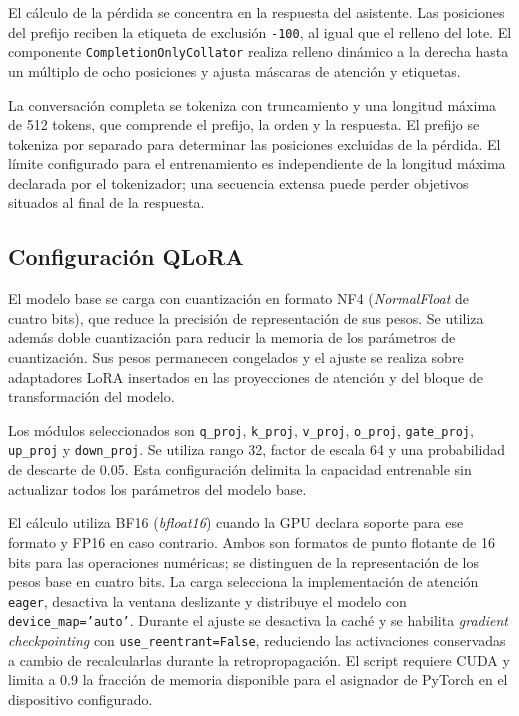 El cálculo de la pérdida se concentra en la respuesta del asistente.
Las posiciones del prefijo reciben la etiqueta de exclusión
\texttt{-100}, al igual que el relleno del lote. El componente
\texttt{Completion\allowbreak Only\allowbreak Collator} realiza relleno dinámico a la derecha
hasta un múltiplo de ocho posiciones y ajusta máscaras de atención y
etiquetas.

La conversación completa se tokeniza con truncamiento y una longitud
máxima de 512 tokens, que comprende el prefijo, la orden y la respuesta.
El prefijo se tokeniza por separado para determinar las posiciones
excluidas de la pérdida. El límite configurado para el entrenamiento
es independiente de la longitud máxima declarada por el tokenizador;
una secuencia extensa puede perder objetivos situados al final de la
respuesta.

\subsection{Configuración QLoRA}

El modelo base se carga con cuantización en formato NF4
(\textit{NormalFloat} de cuatro bits), que reduce la precisión de
representación de sus pesos. Se utiliza además doble cuantización para
reducir la memoria de los parámetros de cuantización. Sus pesos permanecen congelados y el ajuste se
realiza sobre adaptadores LoRA insertados en las proyecciones de atención
y del bloque de transformación del modelo.

Los módulos seleccionados son \texttt{q\_proj}, \texttt{k\_proj},
\texttt{v\_proj}, \texttt{o\_proj}, \texttt{gate\_proj},
\texttt{up\_proj} y \texttt{down\_proj}. Se utiliza rango 32, factor
de escala 64 y una probabilidad de descarte de 0.05. Esta configuración
delimita la capacidad entrenable sin actualizar todos los parámetros
del modelo base.

El cálculo utiliza BF16 (\textit{bfloat16}) cuando la GPU declara soporte
para ese formato y FP16 en caso contrario. Ambos son formatos de punto
flotante de 16 bits para las operaciones numéricas; se distinguen de la
representación de los pesos base en cuatro bits. La carga selecciona la implementación de
atención \texttt{eager}, desactiva la ventana deslizante y distribuye
el modelo con \texttt{device\_\allowbreak map='auto'}. Durante el ajuste se
desactiva la caché y se habilita \textit{gradient checkpointing} con
\texttt{use\_\allowbreak reentrant=False}, reduciendo las activaciones conservadas
a cambio de recalcularlas durante la retropropagación. El script requiere
CUDA y limita a 0.9 la fracción de memoria disponible para el asignador
de PyTorch en el dispositivo configurado.

